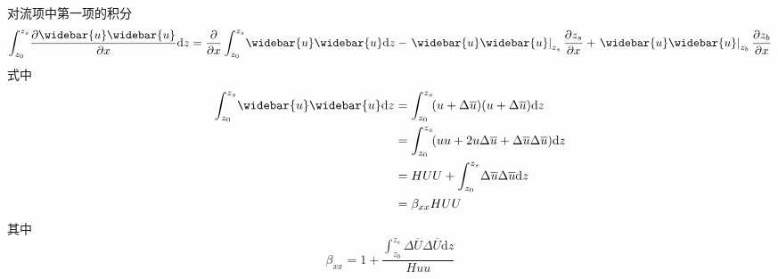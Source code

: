                             对流项中第一项的积分
                            \begin{equation}
                              \int_{z_0}^{ z_{s}}\!
                              \frac{\partial \widebar{u}\widebar{u}}{\partial x}
                              \mathrm{d}z
                              =
                              \frac{\partial}{\partial x}
                              \int_{z_0}^{ z_{s}}\!
                              \widebar{u}\widebar{u}
                              \mathrm{d}z
                              -
                              \left.\widebar{u}\widebar{u}\right|_{z_{s}}\frac{\partial  z_{s}}{\partial x}
                                +
                                \left.\widebar{u}\widebar{u}\right|_{z_{b}}\frac{\partial z_{b}}{\partial x}
                                  \label{EqCGe_CT_1st}
                                \end{equation}
                                式中
                                \begin{equation*}
                                  \begin{aligned}
                                    \int_{z_0}^{ z_{s}}\!
                                    \widebar{u}\widebar{u}
                                    \mathrm{d}z
    &=
    \int_{z_0}^{ z_{s}}\!
    (u+\Delta\overline{u})(u+\Delta\overline{u})
    \mathrm{d}z
    \\
    &=
    \int_{z_0}^{ z_{s}}\!
    (uu+2u\Delta\overline{u}+\Delta\overline{u}\Delta\overline{u})
    \mathrm{d}z
    \\
    &=
    HUU
    +
    \int_{z_0}^{ z_{s}}\!
    \Delta\overline{u}\Delta\overline{u}
    \mathrm{d}z
    \\
    &=
    \beta_{xx}HUU
                                  \end{aligned}
                                \end{equation*}
                                其中
                                \begin{equation}
                                  \beta_{xx}
                                  =
                                  1 +
                                  \frac
                                  {
                                    \int_{z_0}^{ z_{s}}\!
                                    \Delta\overline{U}\Delta\overline{U}
                                    \mathrm{d}z
                                  }
                                  {Huu}
                                \end{equation}
